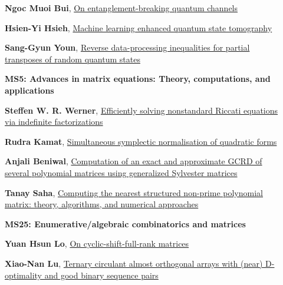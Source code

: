 \documentclass[ILAS2025-program.tex]{subfiles}
\begin{document}
\begin{description}
\begin{description}
        \item[] \hypertarget{up0360}{}\textbf{Ngoc Muoi Bui}, \hyperlink{down0360}{On entanglement-breaking quantum channels}
        \item[] \hypertarget{up0361}{}\textbf{Hsien-Yi Hsieh}, \hyperlink{down0361}{Machine learning enhanced quantum state tomography}
        \item[] \hypertarget{up0362}{}\textbf{Sang-Gyun Youn}, \hyperlink{down0362}{Reverse data-processing inequalities for partial transposes of random quantum states}
        \end{description}
    \begin{description}
    \item[] {\color{mstitle}\textbf{MS5: Advances in matrix equations: Theory, computations, and applications}} 
    \item[] \hypertarget{up0363}{}\textbf{Steffen W. R. Werner}, \hyperlink{down0363}{Efficiently solving nonstandard Riccati equations via indefinite factorizations}
        \item[] \hypertarget{up0364}{}\textbf{Rudra Kamat}, \hyperlink{down0364}{Simultaneous symplectic normalisation of quadratic forms
}
        \item[] \hypertarget{up0365}{}\textbf{Anjali Beniwal}, \hyperlink{down0365}{Computation of an exact and approximate GCRD of several polynomial matrices using generalized Sylvester matrices}
        \item[] \hypertarget{up0366}{}\textbf{Tanay Saha}, \hyperlink{down0366}{Computing the nearest structured non-prime polynomial matrix: theory, algorithms, and numerical approaches}
        \end{description}
    \begin{description}
    \item[] {\color{mstitle}\textbf{MS25: Enumerative/algebraic combinatorics and matrices}} 
    \item[] \hypertarget{up0367}{}\textbf{Yuan Hsun Lo}, \hyperlink{down0367}{On cyclic-shift-full-rank matrices
}
        \item[] \hypertarget{up0368}{}\textbf{Xiao-Nan Lu}, \hyperlink{down0368}{Ternary circulant almost orthogonal arrays with (near) D-optimality and good binary sequence pairs}

\end{description}
\end{description}
\end{document}

